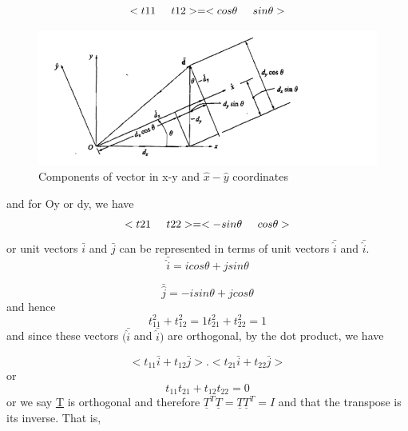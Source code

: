 \documentclass[12pt]{report}
\begin{document}
\begin{equation}<{t11}\hspace{0.5cm}{t12}>=<{cos\theta}\hspace{0.5cm}{sin\theta}>\end{equation}
\begin{figure}
\includegraphics[scale=0.5]{ortho.PNG}
\caption{Components of vector in x-y and $\hat{x}-\hat{y}$ coordinates} 
\label{fig:orthof}
\end{figure}
and for Oy or dy, we have
\begin{equation}<{t21}\hspace{0.5cm}{t22}>=<{-sin\theta}\hspace{0.5cm}{cos\theta}>\end{equation}
or unit vectors $\bar{i}$ and $\bar{j}$ can be represented in terms of
unit vectors $\bar{\hat{i}}$ and $\bar{\hat{i}}$.
\begin{equation}\bar{\hat{i}} =icos\theta+jsin\theta\end{equation}

\begin{equation}\bar{\hat{j}} =-isin\theta+jcos\theta\end{equation}
and hence
\begin{equation}{t}^2_{11} + {t}^2_{12}=1 
{t}^2_{21} + {t}^2_{22}=1\end{equation}
and since these vectors $(\bar{\hat{i}}$ and $\bar{\hat{i}})$ are
orthogonal, by the dot product, we have


\begin{equation}<{t}_{11} \bar{i} + {t}_{12} \bar{j}>.<{t}_{21} \bar{i} +
{t}_{22} \bar{j}>\end{equation}
or \begin{equation}{t}_{11}{t}_{21} + {t}_{12} {t}_{22}=0\end{equation}
or we say \underline{T} is orthogonal and therefore $\underline{T}^T\underline{T}=\underline{T}\underline{T}^T=I$ and
that the transpose is its inverse. That is,
\end{document}
